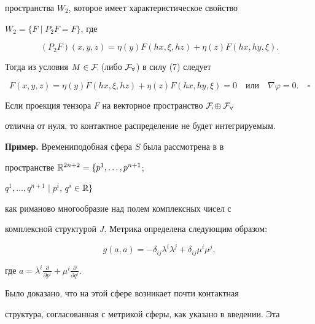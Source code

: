 пространства $W_2$, которое имеет характеристическое свойство 


$W_2=\{F\mid P_2F=F\}$, где 


$$ 


(P_2F)(x,y,z)=\eta(y)F(h x,\xi,h z)+ 


\eta(z)F(h x,h y,\xi). 


$$ 


Тогда из условия $M\in\cal F_7$ (либо $\cal F_8$) в силу (7) следует 


$$ 


F(x,y,z)=\eta(y)F(h x,\xi,h z)+\eta(z)F(h x,h y,\xi)=0\quad 


\text{или}\quad \nabla\varphi =0.\quad\square 


$$ 


 


\begin{cornonum} 


Если проекция тензора $F$ на векторное пространство $\cal F_7\oplus\cal 


F_8$ 


отлична от нуля, то контактное распределение не будет интегрируемым. 


\end{cornonum} 


 


{\bf Пример.} Времениподобная сфера $S$ была рассмотрена в \cite{1} в 


пространстве $\Bbb R^{2n+2}=\linebreak \{p^1,\dotsc,p^{n+1}$; 


$q^1,\dotsc,q^{n+1}\mid p^i$, $q^i\in\Bbb R\}$ 


как риманово многообразие над полем комплексных чисел с 


комплексной структурой $J$. Метрика определена следующим образом: 


$$ 


g(a,a)=-\delta_{i j}\lambda^i\lambda^j+ 


\delta_{i j}\mu^i\mu^j, 


$$ 


где $a=\lambda^i\frac{\partial}{\partial p^i}+ 


\mu^i\frac{\partial}{\partial q^i}$. 


Было доказано, что на этой сфере возникает почти контактная 


структура, согласованная с метрикой сферы, как указано в введении. Эта 


